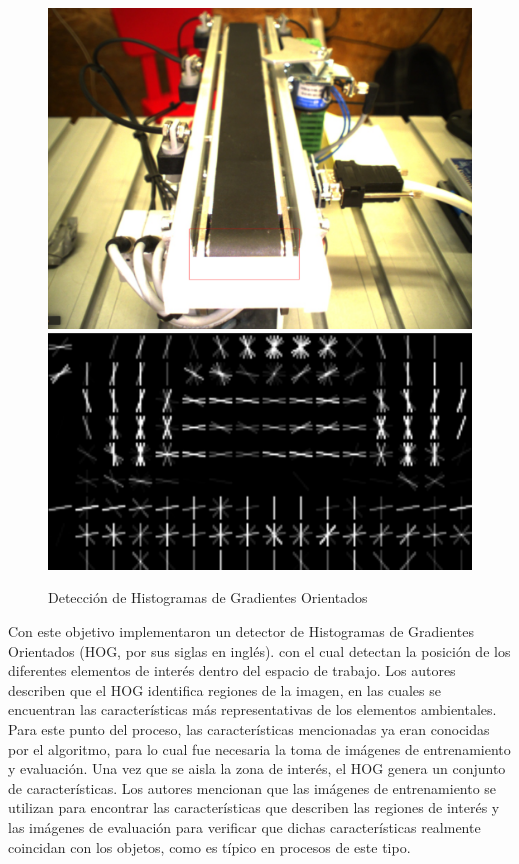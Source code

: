 \begin{figure}[H]
    \centering
    \includegraphics[scale=0.15]{Figures/Conveyor_GRIPS_TDP.png}     \includegraphics[scale=0.2]{Figures/Conveyor_HOG_GRIPS_TDP.png}
        \caption{Detección de Histogramas de Gradientes Orientados \cite{furbaß_robocup_2021}}
        \label{fig:HOG_GRIPS}
    \end{figure}

Con este objetivo implementaron un detector de Histogramas de Gradientes Orientados (HOG, por sus siglas en inglés). con el cual detectan la posición de los diferentes elementos de interés dentro del espacio de trabajo. Los autores describen que el HOG identifica regiones de la imagen, en las cuales se encuentran las características más representativas de los elementos ambientales. Para este punto del proceso, las características mencionadas ya eran conocidas por el algoritmo, para lo cual fue necesaria la toma de imágenes de entrenamiento y evaluación. Una vez que se aisla la zona de interés, el HOG genera un conjunto de características. Los autores mencionan que las imágenes de entrenamiento se utilizan para encontrar las características que describen las regiones de interés y las imágenes de evaluación para verificar que dichas características realmente coincidan con los objetos, como es típico en procesos de este tipo.

